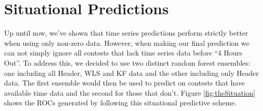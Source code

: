 \pagebreak

\section{Situational Predictions}

Up until now, we've shown that time series predictions perform strictly better when using only non-zero data. However, when making our final prediction we can not simply ignore all contests that lack time series data before ``4 Hours Out''. To address this, we decided to use two distinct random forest ensembles: one including all Header, WLS and KF data and the other including only Header data. The first ensemble would then be used to predict on contests that have available time data and the second for those that don't. Figure \ref{fig:theSituation} shows the ROCs generated by following this situational predictive scheme.

